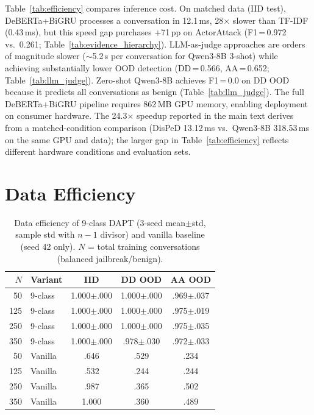 Table~\ref{tab:efficiency} compares inference cost. On matched data (IID test), DeBERTa+BiGRU processes a conversation in 12.1\,ms, 28$\times$ slower than TF-IDF (0.43\,ms), but this speed gap purchases +71\,pp on ActorAttack (F1\,=\,0.972 vs.\ 0.261; Table~\ref{tab:evidence_hierarchy}). LLM-as-judge approaches are orders of magnitude slower ($\sim$5.2\,s per conversation for Qwen3-8B 3-shot) while achieving substantially lower OOD detection (DD\,=\,0.566, AA\,=\,0.652; Table~\ref{tab:llm_judge}). Zero-shot Qwen3-8B achieves F1\,=\,0.0 on DD OOD because it predicts all conversations as benign (Table~\ref{tab:llm_judge}). The full DeBERTa+BiGRU pipeline requires 862\,MB GPU memory, enabling deployment on consumer hardware. The 24.3$\times$ speedup reported in the main text derives from a matched-condition comparison (DisPeD 13.12\,ms vs.\ Qwen3-8B 318.53\,ms on the same GPU and data); the larger gap in Table~\ref{tab:efficiency} reflects different hardware conditions and evaluation sets.

\section{Data Efficiency}
\label{app:data_efficiency}

\begin{table}[ht]
\centering
\footnotesize
\caption{Data efficiency of 9-class DAPT (3-seed mean$\pm$std, sample std with $n{-}1$ divisor) and vanilla baseline (seed 42 only). $N$ = total training conversations (balanced jailbreak/benign).}
\label{tab:data_efficiency}
\begin{tabular}{@{}rlccc@{}}
\toprule
$N$ & \textbf{Variant} & IID & DD OOD & AA OOD \\
\midrule
50 & 9-class & 1.000$\pm$.000 & 1.000$\pm$.000 & .969$\pm$.037 \\
125 & 9-class & 1.000$\pm$.000 & 1.000$\pm$.000 & .975$\pm$.019 \\
250 & 9-class & 1.000$\pm$.000 & 1.000$\pm$.000 & .975$\pm$.035 \\
350 & 9-class & 1.000$\pm$.000 & .978$\pm$.030 & .972$\pm$.033 \\
\midrule
50 & Vanilla & .646 & .529 & .234 \\
125 & Vanilla & .532 & .244 & .244 \\
250 & Vanilla & .987 & .365 & .502 \\
350 & Vanilla & 1.000 & .360 & .489 \\
\bottomrule
\end{tabular}
\end{table}

